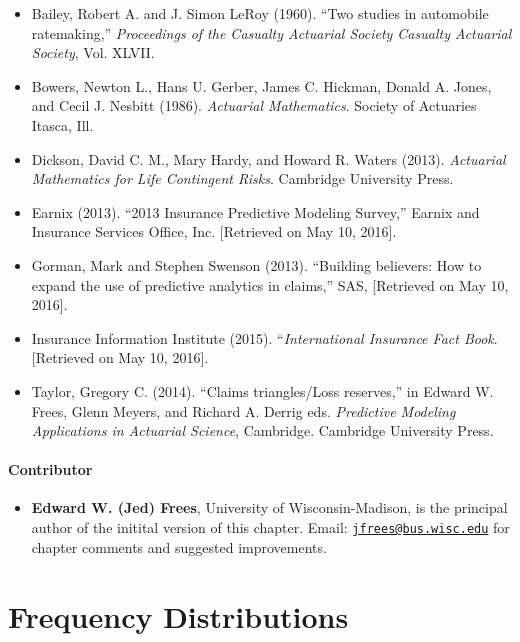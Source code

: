 \documentclass[]{book}
\providecommand{\tightlist}{%
  \setlength{\itemsep}{0pt}\setlength{\parskip}{0pt}}
\begin{document}
\begin{itemize}
\item
  Bailey, Robert A. and J. Simon LeRoy (1960). ``Two studies in
  automobile ratemaking,'' \emph{Proceedings of the Casualty Actuarial
  Society Casualty Actuarial Society}, Vol. XLVII.
\item
  Bowers, Newton L., Hans U. Gerber, James C. Hickman, Donald A. Jones,
  and Cecil J. Nesbitt (1986). \emph{Actuarial Mathematics}. Society of
  Actuaries Itasca, Ill.
\item
  Dickson, David C. M., Mary Hardy, and Howard R. Waters (2013).
  \emph{Actuarial Mathematics for Life Contingent Risks}. Cambridge
  University Press.
\item
  Earnix (2013). ``2013 Insurance Predictive Modeling Survey,'' Earnix
  and Insurance Services Office, Inc. {[}Retrieved on May 10, 2016{]}.
\item
  Gorman, Mark and Stephen Swenson (2013). ``Building believers: How to
  expand the use of predictive analytics in claims,'' SAS, {[}Retrieved
  on May 10, 2016{]}.
\item
  Insurance Information Institute (2015). ``\emph{International
  Insurance Fact Book}. {[}Retrieved on May 10, 2016{]}.
\item
  Taylor, Gregory C. (2014). ``Claims triangles/Loss reserves,'' in
  Edward W. Frees, Glenn Meyers, and Richard A. Derrig eds.
  \emph{Predictive Modeling Applications in Actuarial Science},
  Cambridge. Cambridge University Press.
\end{itemize}

\subsubsection*{Contributor}\label{contributor}

\begin{itemize}
\tightlist
\item
  \textbf{Edward W. (Jed) Frees}, University of Wisconsin-Madison, is
  the principal author of the initital version of this chapter. Email:
  \href{mailto:jfrees@bus.wisc.edu}{\nolinkurl{jfrees@bus.wisc.edu}} for
  chapter comments and suggested improvements.
\end{itemize}

\chapter{Frequency Distributions}\label{frequency-distributions}
\end{document}
